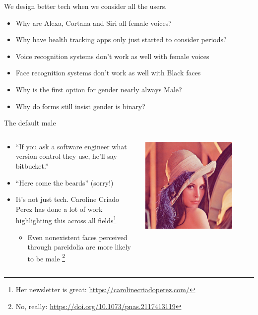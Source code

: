 \documentclass[xcolor=table,aspectratio=169]{beamer}
\begin{document}
\begin{frame}{We design better tech when we consider all the users. }
	\begin{itemize}
		\item Why are Alexa, Cortana and Siri all female voices?
		\item Why have health tracking apps only just started to consider periods?
		\item Voice recognition systems don't work as well with female voices
		\item Face recognition systems don't work as well with Black faces
		\item Why is the first option for gender nearly always Male?
		\item Why do forms still insist gender is binary?
	\end{itemize}
\end{frame}
\begin{frame}{The default male}
	\begin{columns}
		\begin{column}{0.8\textwidth}
	\begin{itemize}
		\item ``If you ask a software engineer what version control they use, he'll say bitbucket.''
		\item ``Here come the beards'' (sorry!)
		\item It's not just tech. Caroline Criado Perez has done a lot of work highlighting this across all fields\footnote{Her newsletter is great: \url{https://carolinecriadoperez.com/}}
			\begin{itemize}
		\item Even nonexistent faces perceived through pareidolia are more likely to be male \footnote{No, really: \url{https://doi.org/10.1073/pnas.2117413119}}
	\end{itemize}
	\end{itemize}
	\end{column}
	\begin{column}{0.2\textwidth}
	\includegraphics[width=0.8\textwidth]{lena.png}
	\end{column}
	\end{columns}
\end{frame}
\end{document}
